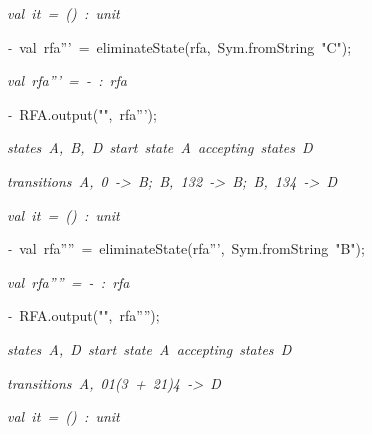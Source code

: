 \begin{list}{}
\item[]\textsl{val\ it\ =\ ()\ :\ unit}
\item[]\textsl{-\ }val\ rfa'''\ =\ eliminateState(rfa,\ Sym.fromString\ "C");
\item[]\textsl{val\ rfa'''\ =\ -\ :\ rfa}
\item[]\textsl{-\ }RFA.output("",\ rfa''');
\item[]\textsl{states\ A,\ B,\ D\ start\ state\ A\ accepting\ states\ D}
\item[]\textsl{transitions\ A,\ 0\ ->\ B;\ B,\ 132\ ->\ B;\ B,\ 134\ ->\ D}
\item[]\textsl{val\ it\ =\ ()\ :\ unit}
\item[]\textsl{-\ }val\ rfa''''\ =\ eliminateState(rfa''',\ Sym.fromString\ "B");
\item[]\textsl{val\ rfa''''\ =\ -\ :\ rfa}
\item[]\textsl{-\ }RFA.output("",\ rfa'''');
\item[]\textsl{states\ A,\ D\ start\ state\ A\ accepting\ states\ D}
\item[]\textsl{transitions\ A,\ 01(3\ +\ 21)4\ ->\ D}
\item[]\textsl{val\ it\ =\ ()\ :\ unit}
\end{list}

